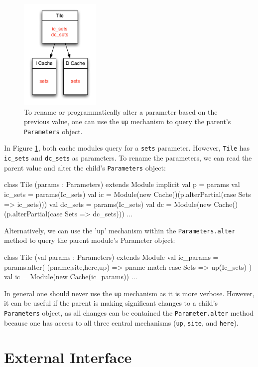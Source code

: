 \documentclass[10pt,twocolumn]{article}
\def\code#1{{\small\tt #1}}
\begin{document}
\begin{figure}[h]
\centering
\includegraphics[width=1.5in]{figs/ex6.pdf}
\caption{To rename or programmatically alter a parameter based on the previous value, one can use the \code{up} mechanism to query the parent's \code{Parameters} object.}
\label{fig:ex6}
\end{figure}

In Figure \ref{fig:ex6}, both cache modules query for a \code{sets} parameter. However, \code{Tile} has \code{ic\_sets} and \code{dc\_sets} as parameters. To rename the parameters, we can read the parent value and alter the child's \code{Parameters} object:

\begin{scala}
class Tile (params : Parameters) extends Module {
  implicit val p = params
  val ic_sets = params(Ic_sets)
  val ic = Module(new Cache()(p.alterPartial({case Sets => ic_sets})))
  val dc_sets = params(Ic_sets)
  val dc = Module(new Cache()(p.alterPartial({case Sets => dc_sets})))
    ...
}
\end{scala}
Alternatively, we can use the 'up' mechanism within the
\code{Parameters.alter} method to query the parent module's Parameter object:
\begin{scala}
class Tile (val params : Parameters) extends Module {
  val ic_params = params.alter(
    (pname,site,here,up) => pname match {
      case Sets => up(Ic_sets)
    }
  )
  val ic = Module(new Cache(ic_params))
  ...
}
\end{scala}
In general one should never use the \code{up} mechanism as it is more verbose. However, it can be useful if the parent is making significant changes to a child's \code{Parameters} object, as all changes can be contained the \code{Parameter.alter} method because one has access to all three central mechanisms (\code{up}, \code{site}, and \code{here}).

\section{External Interface}
\label{sec:knobs}
\end{document}
